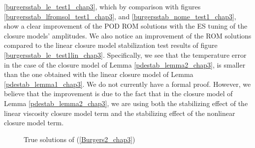 \documentclass[letterpaper,conference,onecolumn,11pt]{IEEEtran}
\begin{document}
\ref{burgersstab_le_test1_chap3}, which by comparison with figures
\ref{burgersstab_lfromsol_test1_chap3}, and
\ref{burgersstab_nome_test1_chap3}, show a clear improvement of
the POD ROM solutions with the ES tuning of the closure models'
amplitudes. We also notice an improvement of the ROM solutions
compared to the linear closure model stabilization test results of
figure  \ref{burgersstab_le_test1lin_chap3}. Specifically, we see
that the temperature error in the case of the closure model of
Lemma \ref{pdestab_lemma2_chap3}, is smaller than the one obtained
with the linear closure model of Lemma \ref{pdestab_lemma1_chap3}.
We do not currently have a formal proof. However, we believe that
the improvement is due to the fact that in the closure model of
Lemma \ref{pdestab_lemma2_chap3}, we are using both the
stabilizing effect of the linear viscosity closure model term and
the stabilizing effect of the nonlinear closure model term.


\begin{figure}\center
  \begin{minipage}{0.4\linewidth}
 \center{}
  \end{minipage}
  \hfill
  \begin{minipage}{0.4\linewidth}
   \center{}
  \end{minipage}
  \caption{True solutions of (\ref{Burgers2_chap3})}
  \label{burgersstab_truesol_test1_chap3}
\end{figure}
\end{document}
